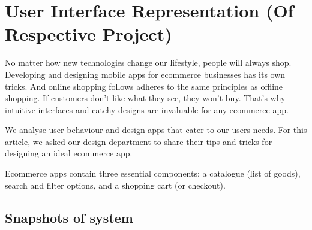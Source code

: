 \section{User Interface Representation (Of  Respective Project)}
No matter how new technologies change our lifestyle, people will always shop. Developing and designing mobile apps for ecommerce businesses has its own tricks. And online shopping follows adheres to the same principles as offline shopping. If customers don’t like what they see, they won’t buy. That’s why intuitive interfaces and catchy designs are invaluable for any ecommerce app.

We analyse user behaviour and design apps that cater to our users needs. For this article, we asked our design department to share their tips and tricks for designing an ideal ecommerce app.

Ecommerce apps contain three essential components: a catalogue (list of goods), search and filter options, and a shopping cart (or checkout).

\subsection{Snapshots of system}


